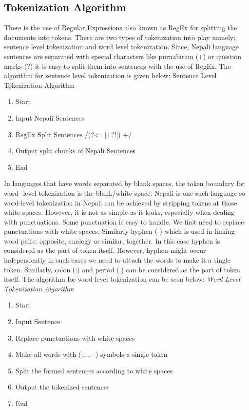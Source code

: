             \subsection{Tokenization Algorithm}
There is the use of Regular Expressions also known as RegEx for splitting the
documents into tokens. There are two types of tokenization into play namely; sentence
level tokenization and word level tokenization. Since, Nepali language sentences are
separated with special characters like purnabiram (।) or question marks (?) it is easy to
split them into sentences with the use of RegEx. The algorithm for sentence level
tokenization is given below;
Sentence Level Tokenization Algorithm
                \begin{enumerate}
                    \item Start
                    \item Input Nepali Sentences
                    \item RegEx Split Sentences /(?<=[।?!]) +/
                    \item Output split chunks of Nepali Sentences
                    \item End
                \end{enumerate}
In languages that have words separated by blank spaces, the token boundary for word-
level tokenization is the blank/white space. Nepali is one such language so word-level
tokenization in Nepali can be achieved by stripping tokens at those white spaces.
However, it is not as simple as it looks, especially when dealing with punctuations.
Some punctuation is easy to handle. We first need to replace punctuations with white
spaces. Similarly hyphen (-) which is used in linking word pairs: opposite, analogy or
similar, together. In this case hyphen is considered as the part of token itself. However,
hyphen might occur independently in such cases we need to attach the words to make
it a single token. Similarly, colon (:) and period (.) can be considered as the part of
token itself. The algorithm for word level tokenization can be seen below:
                \textit{Word Level Tokenization Algorithm}
                \begin{enumerate}
                    \item Start
                    \item Input Sentence
                    \item Replace punctuations with white spaces
                    \item Make all words with (:, ., -) symbols a single token
                    \item Split the formed sentences according to white spaces
                    \item Output the tokenized sentences
                    \item End
                \end{enumerate}
